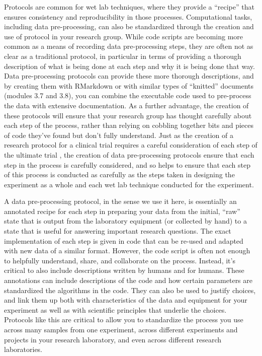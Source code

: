 \documentclass[]{tufte-book}
\begin{document}
Protocols are common for wet lab techniques, where they provide a ``recipe'' that
ensures consistency and reproducibility in those processes. Computational tasks,
including data pre-processing, can also be standardized through the creation and
use of protocol in your research group. While code scripts are becoming more
common as a means of recording data pre-processing steps, they are often not
as clear as a traditional protocol, in particular in terms of providing a
thorough description of what is being done at each step and why it is being
done that way. Data pre-processing protocols can provide these more thorough
descriptions, and by creating them with RMarkdown or with similar types
of ``knitted'' documents (modules 3.7 and 3.8), you can combine the executable code
used to pre-process the data with extensive documentation. As a further
advantage, the creation of these protocols will ensure that your research
group has thought carefully about each step of the process, rather than
relying on cobbling together bits and pieces of code they've found but don't
fully understand. Just as the creation of a research protocol for a
clinical trial requires a careful consideration of each step of the ultimate
trial \citep{al2016protocol}, the creation of data pre-processing protocols ensure
that each step in the process is carefully considered, and so helps to
ensure that each step of this process is conducted as carefully as the
steps taken in designing the experiment as a whole and each wet lab technique
conducted for the experiment.

A data pre-processing protocol, in the sense we use it here, is essentially an
annotated recipe for each step in preparing your data from the initial, ``raw''
state that is output from the laboratory equipment (or collected by hand) to a
state that is useful for answering important research questions. The exact
implementation of each step is given in code that can be re-used and adapted
with new data of a similar format. However, the code script is often not enough
to helpfully understand, share, and collaborate on the process. Instead, it's
critical to also include descriptions written by humans and for humans. These
annotations can include descriptions of the code and how certain parameters are
standardized the algorithms in the code. They can also be used to justify
choices, and link them up both with characteristics of the data and equipment
for your experiment as well as with scientific principles that underlie the
choices. Protocols like this are critical to allow you to standardize the
process you use across many samples from one experiment, across different
experiments and projects in your research laboratory, and even across different
research laboratories.
\end{document}
